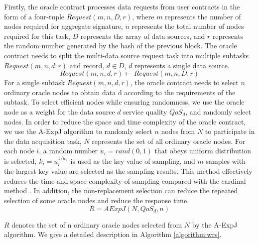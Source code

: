 \documentclass[paper]{ieice}
\begin{document}
Firstly, the oracle contract processes data requests from user contracts in the form of a four-tuple $Request(m,n,D,r)$, where $m$ represents the number of nodes required for aggregate signature, $n$ represents the total number of nodes required for this task, $D$ represents the array of data sources, and $r$ represents the random number generated by the hash of the previous block. The oracle contract needs to split the multi-data source request task into multiple subtasks $Request(m,n,d,r)$ and record, $d \in D$, $d$ represents a single data source.
\begin{equation}
  Request(m,n,d,r) \gets Request(m,n,D,r)
\end{equation}
For a single subtask $Request(m,n,d,r)$, the oracle contract needs to select $n$ ordinary oracle nodes to obtain data d according to the requirements of the subtask. To select efficient nodes while ensuring randomness, we use the oracle node as a weight for the data source $d$ service quality $QoS_d$, and randomly select nodes. In order to reduce the space and time complexity of the oracle contract, we use the A-ExpJ algorithm \cite{efraimidis2006weighted} to randomly select $n$ nodes from $N$ to participate in the data acquisition task, $N$ represents the set of all ordinary oracle nodes. For each node $i$, a random number $u_i=rand(0,1)$ that obeys uniform distribution is selected, $k_i=u_i^{1/w_i}$ is used as the key value of sampling, and $m$ samples with the largest key value are selected as the sampling results. This method effectively reduces the time and space complexity of sampling compared with the cardinal method \cite{efraimidis2015weighted}. In addition, the non-replacement selection can reduce the repeated selection of some oracle nodes and reduce the response time.
\begin{equation}
    R = AExpJ(N,QoS_d,n)
\end{equation}

$R$ denotes the set of n ordinary oracle nodes selected from $N$ by the A-ExpJ algorithm. We give a detailed description in Algorithm \ref{algorithm:wrs}.
\end{document}
